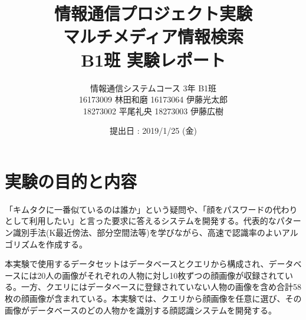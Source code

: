 \documentclass[10.5pt,a4j]{jarticle}
\title{\vspace{10mm} \huge 情報通信プロジェクト実験\vspace{15mm} \\ \huge マルチメディア情報検索\\ B1班 実験レポート \vspace{120mm}}
\author{情報通信システムコース 3年 B1班\\
		16173009 林田和磨 16173064 伊藤光太郎\\
		18273002 平尾礼央 18273003 伊藤広樹　\\}
\date{提出日 : 2019/1/25 (金)}
\begin{document}
	\maketitle
	\thispagestyle{empty}
	\clearpage
	\addtocounter{page}{-1}

	\section{実験の目的と内容}
	「キムタクに一番似ているのは誰か」という疑問や、「顔をパスワードの代わりとして利用したい」と言った要求に答えるシステムを開発する。代表的なパターン識別手法(K最近傍法、部分空間法等)を学びながら、高速で認識率のよいアルゴリズムを作成する。

	本実験で使用するデータセットはデータベースとクエリから構成され、データベースには20人の画像がそれぞれの人物に対し10枚ずつの顔画像が収録されている。一方、クエリにはデータベースに登録されていない人物の画像を含め合計58枚の顔画像が含まれている。本実験では、クエリから顔画像を任意に選び、その画像がデータベースのどの人物かを識別する顔認識システムを開発する。
\end{document}

